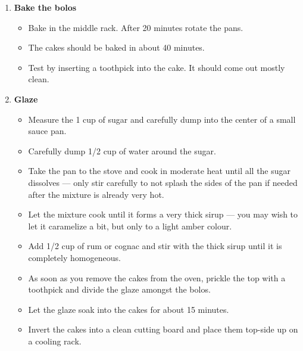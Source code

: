 \documentclass[11pt,letterpaper]{article}
\newcommand \fileName {BoloVinho}
\begin{document}
\begin{description}
\begin{enumerate}
\begin{itemize}
		\item Divide half of the batter into the bottom of the prepared pans.
		\item Divide the blueberries and gently spread half of them on top of the batter in the pans --- it is best to use a small spoon and lay each blueberry individually in its place.
		\item Spread the other half of the batter on top of the layer of blueberries.
		\item Spread the other half of the blueberries on top of the cakes,
		\item Bake in the middle rack. After 20 minutes rotate the pans.
		\item The bolos should be baked in about 40 minutes.
		\item Test by inserting a toothpick into the bolo. It should come out mostly clean.
	\end{itemize}
	
	\item {\bf Bake the bolos}
	\begin{itemize}
		\item Bake in the middle rack. After 20 minutes rotate the pans.
		\item The cakes should be baked in about 40 minutes.
		\item Test by inserting a toothpick into the cake. It should come out mostly clean.
	\end{itemize}
        
         \item {\bf Glaze}
       	\begin{itemize}
        \item Measure the 1 cup of sugar and carefully dump into the center of a small sauce pan.
        \item Carefully dump 1/2 cup of water around the sugar. 
        \item Take the pan to the stove and cook in moderate heat until all the sugar dissolves --- only stir carefully to not splash the sides of the pan if needed after the mixture is already very hot.
        \item Let the mixture cook until it forms a very thick sirup --- you may wish to let it caramelize a bit, but only to a light amber colour.
        \item Add 1/2 cup of rum or cognac and stir with the thick sirup until it is completely homogeneous.
        \item As soon as you remove the cakes from the oven, prickle the top with a toothpick and divide the glaze amongst the bolos.
        \item Let the glaze soak into the cakes for about 15 minutes.
        \item Invert the cakes into a clean cutting board and place them top-side up on a cooling rack.
         \end{itemize}
     	\end{enumerate}         
\end{description}

\end{document}
